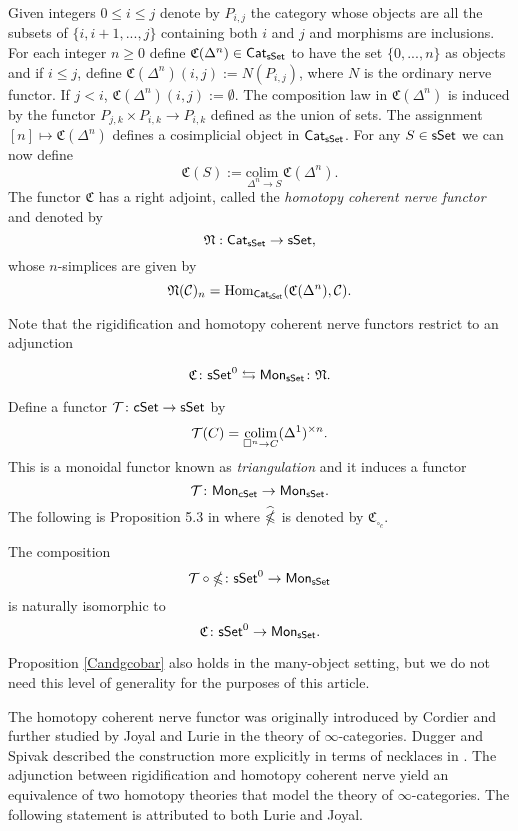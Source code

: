 Given integers $0 \leq  i \leq j$ denote by $P_{i,j}$ the category whose objects are all the subsets of $\{i, i+1, ..., j\}$ containing both $i$ and $j$ and morphisms are inclusions. For each integer $n \geq 0$ define $\mathfrak{C}(\Delta^n) \in \mathsf{Cat}_{\mathsf{sSet}}$ to have the set $\{0, ... , n\}$ as objects and if $i \leq j$, define $\mathfrak{C}(\Delta^n)(i,j):= N(P_{i,j})$, where $N$ is the ordinary nerve functor. If $j < i$, $\mathfrak{C}(\Delta^n)(i,j):= \emptyset.$ The composition law in $\mathfrak{C}(\Delta^n)$ is induced by the functor $P_{j,k} \times P_{i,k} \to P_{i,k}$ defined as the union of sets. The assignment $[n] \mapsto \mathfrak{C}(\Delta^n)$ defines a cosimplicial object in $\mathsf{Cat}_{\mathsf{sSet}}$. For any $S \in \mathsf{sSet}$ we can now define
 $$\mathfrak{C}(S):= \underset{{\Delta^n \to S} }{\text{colim }} \mathfrak{C}(\Delta^n).$$
The functor $\mathfrak{C}$ has a right adjoint, called the \textit{homotopy coherent nerve functor} and denoted by
$$\mathfrak{N}: \mathsf{Cat}_{\mathsf{sSet}} \to \mathsf{sSet},$$ whose $n$-simplices are given by 
$$\mathfrak{N}(\mathcal{C})_n=\text{Hom}_{\mathsf{Cat}_{\mathsf{sSet}}}(\mathfrak{C}(\Delta^n), \mathcal{C}).$$

Note that the rigidification and homotopy coherent nerve functors restrict to an adjunction

$$ \mathfrak{C} \colon \mathsf{sSet}^0 \leftrightarrows \mathsf{Mon}_{\mathsf{sSet}} \colon \mathfrak{N}.$$

Define a functor $\mathcal{T} \colon \mathsf{cSet} \to \mathsf{sSet}$ by $$\mathcal{T}(C) = \operatorname*{colim}_{\square^n \to C} (\Delta^1)^{\times n}.$$
This is a monoidal functor known as \textit{triangulation} and it induces a functor $$\mathcal{T} \colon \mathsf{Mon}_{\mathsf{cSet}} \to \mathsf{Mon}_{\mathsf{sSet}}.$$ The following is Proposition 5.3 in \cite{rivera2018cubical} where $\widehat{\operatorname{\mathbb{\Omega}}}$ is denoted by $\mathfrak{C}_{\square_c}.$

\begin{proposition}\label{Candgcobar} The composition 
$$\mathcal{T} \circ \operatorname{\mathbb{\Omega}} \colon \mathsf{sSet}^0 \to \mathsf{Mon}_{\mathsf{sSet}}$$ is naturally isomorphic to
$$\mathfrak{C} \colon \mathsf{sSet}^0 \to \mathsf{Mon}_{\mathsf{sSet}}.$$
\end{proposition}

Proposition \ref{Candgcobar} also holds in the many-object setting, but we do not need this level of generality for the purposes of this article. 

The homotopy coherent nerve functor was originally introduced by Cordier and further studied by Joyal and Lurie in the theory of $\infty$-categories. Dugger and Spivak described the construction more explicitly in terms of necklaces in \cite{dugger2011rigidification}. The adjunction between rigidification and homotopy coherent nerve yield an equivalence of two homotopy theories that model the theory of $\infty$-categories. The following statement is attributed to both Lurie and Joyal. 

